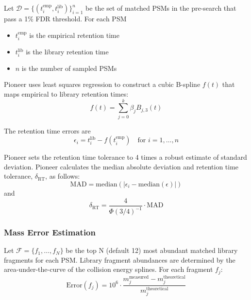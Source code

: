 \documentclass[pdflatex,sn-nature]{sn-jnl}
\begin{document}
Let $\mathcal{D} = \{(t_i^{\text{emp}}, t_i^{\text{lib}})\}_{i=1}^{n}$ be the set of matched PSMs in the pre-search that pass a 1\% FDR threshold. For each PSM
\begin{itemize}
    \item $t_i^{\text{emp}}$ is the empirical retention time
    \item $t_i^{\text{lib}}$ is the library retention time
    \item $n$ is the number of sampled PSMs
\end{itemize}

Pioneer uses least squares regression to construct a cubic B-spline $f(t)$ that maps empirical to library retention times:
\begin{equation}
    f(t) = \sum_{j=0}^{k} \beta_j B_{j,3}(t)
\end{equation}

The retention time errors are
\begin{equation}
    \epsilon_i = t_i^{\text{lib}} - f(t_i^{\text{emp}}) \quad \text{for } i = 1,\ldots,n
\end{equation}

Pioneer sets the retention time tolerance to 4 times a robust estimate of standard deviation. Pioneer calculates the median absolute deviation and retention time tolerance, $\delta_{\text{RT}}$, as follows:
\begin{equation} \text{MAD} = \text{median}\left(|\epsilon_i - \text{median}(\epsilon)|\right) \end{equation}
and 
\begin{equation}
    \delta_{\text{RT}} = \frac{4}{\Phi(3/4)^{-1}} \cdot \text{MAD}
\end{equation}

\subsubsection{Mass Error Estimation}
Let $\mathcal{F} = \{f_1, \ldots, f_N\}$ be the top N (default 12) most abundant matched library fragments for each PSM. Library fragment abundances are determined by the area-under-the-curve of the collision energy splines. For each fragment $f_j$:
\begin{equation}
    \text{Error}(f_j) = 10^6 \cdot \frac{m_j^{\text{measured}} - m_j^{\text{theoretical}}}{m_j^{\text{theoretical}}}
\end{equation}
\end{document}
